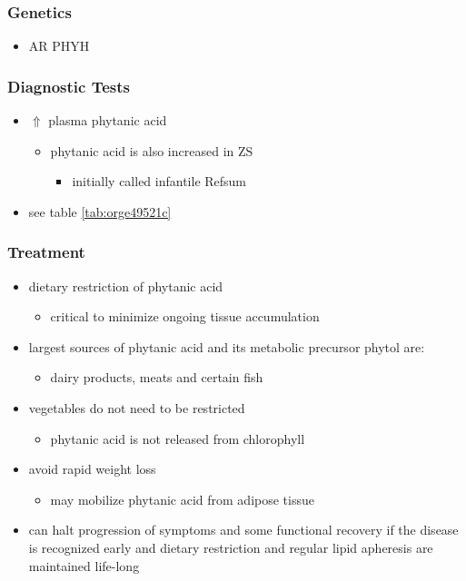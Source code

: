 \documentclass[12pt]{scrartcl}
\begin{document}
\subsubsection{Genetics}
\label{sec:org8a34934}
\begin{itemize}
\item AR PHYH
\end{itemize}

\subsubsection{Diagnostic Tests}
\label{sec:org06d0838}
\begin{itemize}
\item \(\Uparrow\) plasma phytanic acid 
\begin{itemize}
\item phytanic acid is also increased in ZS
\begin{itemize}
\item initially called infantile Refsum
\end{itemize}
\end{itemize}
\item see table \ref{tab:orge49521c}
\end{itemize}
\subsubsection{Treatment}
\label{sec:org6807226}
\begin{itemize}
\item dietary restriction of phytanic acid 
\begin{itemize}
\item critical to minimize ongoing tissue accumulation
\end{itemize}
\item largest sources of phytanic acid and its metabolic precursor phytol are:
\begin{itemize}
\item dairy products, meats and certain fish
\end{itemize}
\item vegetables do not need to be restricted
\begin{itemize}
\item phytanic acid is not released from chlorophyll
\end{itemize}
\item avoid rapid weight loss
\begin{itemize}
\item may mobilize phytanic acid from adipose tissue
\end{itemize}
\item can halt progression of symptoms and some functional recovery if the
disease is recognized early and dietary restriction and regular
lipid apheresis are maintained life-long
\end{itemize}
\end{document}
